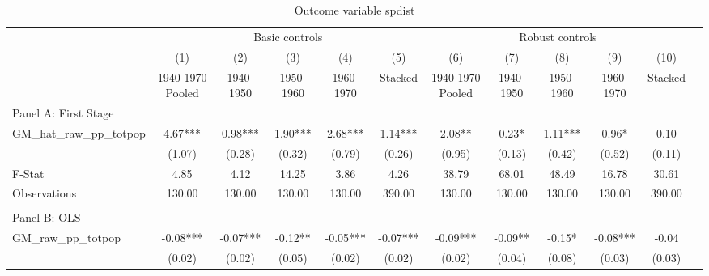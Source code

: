 \begin{table}[htbp]\centering {} \begin{threeparttable} \caption{Outcome variable spdist} \begin{tabular}{l*{11}{c}} \toprule
          &\multicolumn{5}{c}{Basic controls}                                   &\multicolumn{5}{c}{Robust controls}                                  \\\cmidrule(lr){2-6}\cmidrule(lr){7-11}
          &\multicolumn{1}{c}{(1)}&\multicolumn{1}{c}{(2)}&\multicolumn{1}{c}{(3)}&\multicolumn{1}{c}{(4)}&\multicolumn{1}{c}{(5)}&\multicolumn{1}{c}{(6)}&\multicolumn{1}{c}{(7)}&\multicolumn{1}{c}{(8)}&\multicolumn{1}{c}{(9)}&\multicolumn{1}{c}{(10)}\\
          &\multicolumn{1}{c}{1940-1970 Pooled}&\multicolumn{1}{c}{1940-1950}&\multicolumn{1}{c}{1950-1960}&\multicolumn{1}{c}{1960-1970}&\multicolumn{1}{c}{Stacked}&\multicolumn{1}{c}{1940-1970 Pooled}&\multicolumn{1}{c}{1940-1950}&\multicolumn{1}{c}{1950-1960}&\multicolumn{1}{c}{1960-1970}&\multicolumn{1}{c}{Stacked}\\
\cmidrule(lr){1-11}
\multicolumn{10}{l}{Panel A: First Stage}\\
\cmidrule(lr){1-11}
GM\_hat\_raw\_pp\_totpop&      4.67***&      0.98***&      1.90***&      2.68***&      1.14***&      2.08** &      0.23*  &      1.11***&      0.96*  &      0.10   \\
          &    (1.07)   &    (0.28)   &    (0.32)   &    (0.79)   &    (0.26)   &    (0.95)   &    (0.13)   &    (0.42)   &    (0.52)   &    (0.11)   \\
\midrule
F-Stat    &      4.85   &      4.12   &     14.25   &      3.86   &      4.26   &     38.79   &     68.01   &     48.49   &     16.78   &     30.61   \\
Observations&    130.00   &    130.00   &    130.00   &    130.00   &    390.00   &    130.00   &    130.00   &    130.00   &    130.00   &    390.00   \\
\cmidrule[\heavyrulewidth](lr){1-11} \\ \cmidrule[\heavyrulewidth](lr){1-11}
\multicolumn{10}{l}{Panel B: OLS}\\
\cmidrule(lr){1-11}
GM\_raw\_pp\_totpop&     -0.08***&     -0.07***&     -0.12** &     -0.05***&     -0.07***&     -0.09***&     -0.09** &     -0.15*  &     -0.08***&     -0.04   \\
          &    (0.02)   &    (0.02)   &    (0.05)   &    (0.02)   &    (0.02)   &    (0.02)   &    (0.04)   &    (0.08)   &    (0.03)   &    (0.03)   \\

\end{tabular}
\end{threeparttable}
\end{table}

